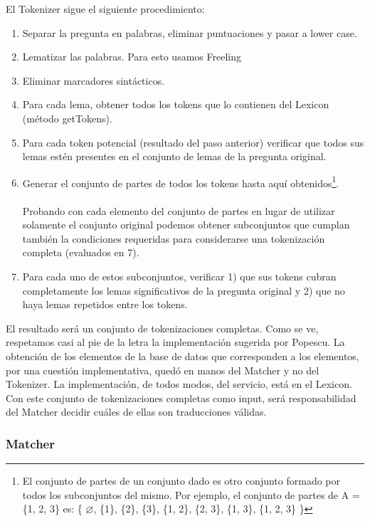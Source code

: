 \medskip

El Tokenizer sigue el siguiente procedimiento:
\begin{enumerate}
\item Separar la pregunta en palabras, eliminar puntuaciones y pasar a lower case.
\item Lematizar las palabras. Para esto usamos Freeling
\item Eliminar marcadores sintácticos.
\item Para cada lema, obtener todos los tokens que lo contienen del Lexicon (método getTokens).
\item Para cada token potencial (resultado del paso anterior) verificar que todos sus lemas estén presentes en el conjunto de lemas de la pregunta original.
\item Generar el conjunto de partes de todos los tokens hasta aquí obtenidos\footnote{El conjunto de partes de un conjunto dado es otro conjunto formado por todos los subconjuntos del mismo. Por ejemplo, el conjunto de partes de A = \{1, 2, 3\} es: \{ $\varnothing$, \{1\}, \{2\}, \{3\}, \{1, 2\}, \{2, 3\}, \{1, 3\}, \{1, 2, 3\} \}}. \\ \\
	Probando con cada elemento del conjunto de partes en lugar de utilizar solamente el conjunto original podemos obtener subconjuntos que cumplan también la condiciones requeridas para considerarse una tokenización completa (evaluados en 7).
\item Para cada uno de estos subconjuntos, verificar 1) que sus tokens cubran completamente los lemas significativos de la pregunta original y 2) que no haya lemas repetidos entre los tokens.
\end{enumerate}

El resultado será un conjunto de tokenizaciones completas. Como se ve, respetamos casi al pie de la letra la implementación sugerida por Popescu. La obtención de los elementos de la base de datos que corresponden a los elementos, por una cuestión implementativa, quedó en manos del Matcher y no del Tokenizer. La implementación, de todos modos, del servicio, está en el Lexicon. Con este conjunto de tokenizaciones completas como input, será responsabilidad del Matcher decidir cuáles de ellas son traducciones válidas.

\subsubsection*{Matcher}
\label{subsubsec:matcher}

